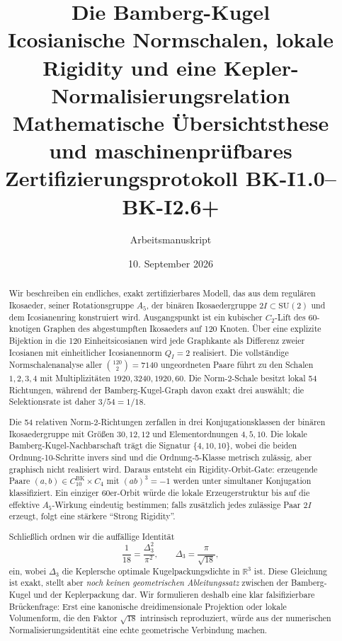 \documentclass[11pt,a4paper]{article}
\title{\textbf{Die Bamberg-Kugel}\\
\large Icosianische Normschalen, lokale Rigidity und eine Kepler-Normalisierungsrelation\\[4pt]
\small Mathematische Übersichtsthese und maschinenprüfbares Zertifizierungsprotokoll BK-I1.0--BK-I2.6+}
\author{Arbeitsmanuskript}
\date{10. September 2026}
\theoremstyle{definition}
\newcommand{\twoI}{2I}
\newcommand{\QI}{Q_I}
\newcommand{\R}{\mathbb R}
\begin{document}
\maketitle

\begin{abstract}
Wir beschreiben ein endliches, exakt zertifizierbares Modell, das aus dem regulären Ikosaeder, seiner Rotationsgruppe \(A_5\), der binären Ikosaedergruppe \(\twoI\subset \mathrm{SU}(2)\) und dem Icosianenring konstruiert wird. Ausgangspunkt ist ein kubischer \(C_2\)-Lift des 60-knotigen Graphen des abgestumpften Ikosaeders auf 120 Knoten. Über eine explizite Bijektion in die 120 Einheitsicosianen wird jede Graphkante als Differenz zweier Icosianen mit einheitlicher Icosianennorm \(\QI=2\) realisiert. Die vollständige Normschalenanalyse aller \(\binom{120}{2}=7140\) ungeordneten Paare führt zu den Schalen \(1,2,3,4\) mit Multiplizitäten \(1920,3240,1920,60\). Die Norm-\(2\)-Schale besitzt lokal 54 Richtungen, während der Bamberg-Kugel-Graph davon exakt drei auswählt; die Selektionsrate ist daher \(3/54=1/18\).

Die 54 relativen Norm-\(2\)-Richtungen zerfallen in drei Konjugationsklassen der binären Ikosaedergruppe mit Größen \(30,12,12\) und Elementordnungen \(4,5,10\). Die lokale Bamberg-Kugel-Nachbarschaft trägt die Signatur \(\{4,10,10\}\), wobei die beiden Ordnung-10-Schritte invers sind und die Ordnung-5-Klasse metrisch zulässig, aber graphisch nicht realisiert wird. Daraus entsteht ein Rigidity-Orbit-Gate: erzeugende Paare \((a,b)\in C_{10}^{\mathrm{BK}}\times C_4\) mit \((ab)^3=-1\) werden unter simultaner Konjugation klassifiziert. Ein einziger 60er-Orbit würde die lokale Erzeugerstruktur bis auf die effektive \(A_5\)-Wirkung eindeutig bestimmen; falls zusätzlich jedes zulässige Paar \(\twoI\) erzeugt, folgt eine stärkere ``Strong Rigidity''.

Schließlich ordnen wir die auffällige Identität
\[
\frac1{18}=\frac{\Delta_3^2}{\pi^2},\qquad \Delta_3=\frac{\pi}{\sqrt{18}},
\]
ein, wobei \(\Delta_3\) die Keplersche optimale Kugelpackungsdichte in \(\R^3\) ist. Diese Gleichung ist exakt, stellt aber \emph{noch keinen geometrischen Ableitungssatz} zwischen der Bamberg-Kugel und der Keplerpackung dar. Wir formulieren deshalb eine klar falsifizierbare Brückenfrage: Erst eine kanonische dreidimensionale Projektion oder lokale Volumenform, die den Faktor \(\sqrt{18}\) intrinsisch reproduziert, würde aus der numerischen Normalisierungsidentität eine echte geometrische Verbindung machen.
\end{abstract}
\end{document}
